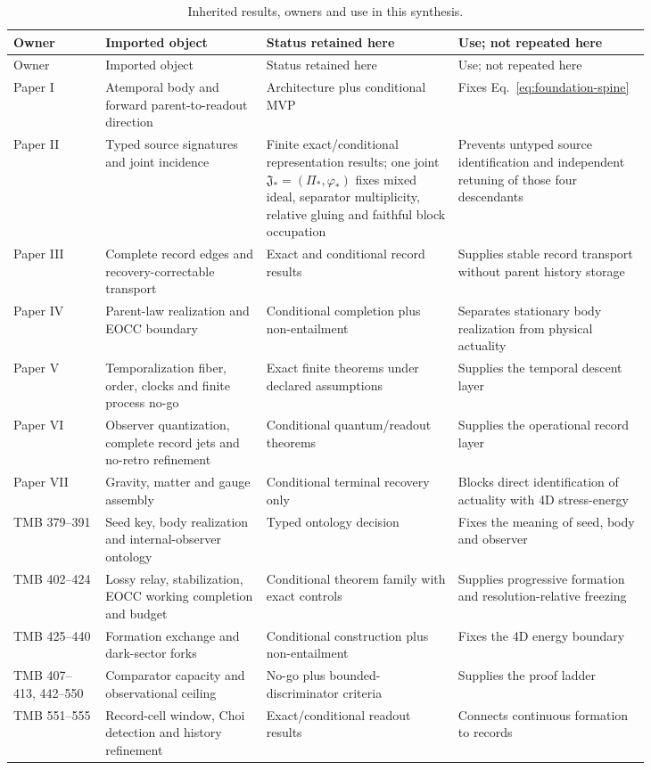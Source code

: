 \documentclass[11pt]{article}
\begin{document}
\small
\begin{longtable}{@{}L{0.12\linewidth}L{0.21\linewidth}L{0.25\linewidth}L{0.25\linewidth}@{}}
\caption{Inherited results, owners and use in this synthesis.}\label{tab:ownership}\\
\toprule
Owner & Imported object & Status retained here & Use; not repeated here \\
\midrule
\endfirsthead
\toprule
Owner & Imported object & Status retained here & Use; not repeated here \\
\midrule
\endhead
Paper I & Atemporal body and forward parent-to-readout direction &
Architecture plus conditional MVP & Fixes Eq.~\eqref{eq:foundation-spine} \\
Paper II & Typed source signatures and joint incidence &
Finite exact/conditional representation results; one joint
$\mathfrak J_*=(\Pi_*,\varphi_*)$ fixes mixed ideal, separator multiplicity,
relative gluing and faithful block occupation & Prevents untyped source
identification and independent retuning of those four descendants \\
Paper III & Complete record edges and recovery-correctable transport &
Exact and conditional record results & Supplies stable record transport
without parent history storage \\
Paper IV & Parent-law realization and EOCC boundary &
Conditional completion plus non-entailment & Separates stationary body
realization from physical actuality \\
Paper V & Temporalization fiber, order, clocks and finite process no-go &
Exact finite theorems under declared assumptions & Supplies the temporal
descent layer \\
Paper VI & Observer quantization, complete record jets and no-retro refinement &
Conditional quantum/readout theorems & Supplies the operational record layer \\
Paper VII & Gravity, matter and gauge assembly &
Conditional terminal recovery only & Blocks direct identification of actuality
with 4D stress-energy \\
TMB 379--391 & Seed key, body realization and internal-observer ontology &
Typed ontology decision & Fixes the meaning of seed, body and observer \\
TMB 402--424 & Lossy relay, stabilization, EOCC working completion and budget &
Conditional theorem family with exact controls & Supplies progressive
formation and resolution-relative freezing \\
TMB 425--440 & Formation exchange and dark-sector forks &
Conditional construction plus non-entailment & Fixes the 4D energy boundary \\
TMB 407--413, 442--550 & Comparator capacity and observational ceiling &
No-go plus bounded-discriminator criteria & Supplies the proof ladder \\
TMB 551--555 & Record-cell window, Choi detection and history refinement &
Exact/conditional readout results & Connects continuous formation to records \\
\bottomrule
\end{longtable}
\end{document}
